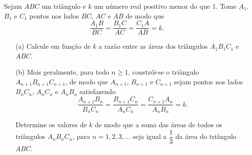 Sejam $ABC$ um triângulo e $k$ um número real positivo menor do que $1$. Tome $A_1$, $B_1$ e $C_1$ pontos nos lados $BC$, $AC$ e $AB$ de modo que $$\frac{A_1B}{BC} = \frac{B_1C}{AC} = \frac{C_1A}{AB} = k.$$

\begin{enumerate}[label = (\alph*)]
	\item[(a)] Calcule em função de $k$ a razão entre as áreas dos triângulos $A_1B_1C_1$ e $ABC$.
	\item[(b)] Mais geralmente, para todo $n \ge 1$, constrói-se o triângulo $A_{n+1}B_{n+1}C_{n+1}$, de modo que $A_{n+1}$, $B_{n+1}$ e $C_{n+1}$ sejam pontos nos lados $B_nC_n$, $A_nC_n$ e $A_nB_n$ satisfazendo $$\frac{A_{n+1}B_n}{B_nC_n} = \frac{B_{n+1}C_n}{A_nC_n} = \frac{C_{n+1}A_n}{A_nB_n} = k.$$

Determine os valores de $k$ de modo que a soma das áreas de todos os triângulos $A_nB_nC_n$, para $n = 1, 2, 3, \dots$ seja igual a $\dfrac{1}{3}$ da área do triângulo $ABC$.
\end{enumerate}
